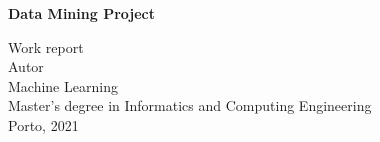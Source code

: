 \documentclass[a4paper,12pt]{report}
\begin{document}
	\begin{titlepage}
		
		\begin{center}
		
		
		
		\vspace{3cm}
		\huge
		\textbf{Data Mining Project}
		
		\Large
		Work report\\
		
		
		\vspace{2.5cm}
		\large
		Autor\\

		
		\vspace{3cm}
		Machine Learning\\
		Master's degree in Informatics and Computing Engineering \\
		
		\vspace{2cm}		
		Porto, 2021
		
		\end{center}
	\end{titlepage}	
	
	
	
	
	\begin{abstract}
	
	\end{abstract}	
	
	
	\newpage
	\tableofcontents
	
	\newpage	
	



	
\end{document}

